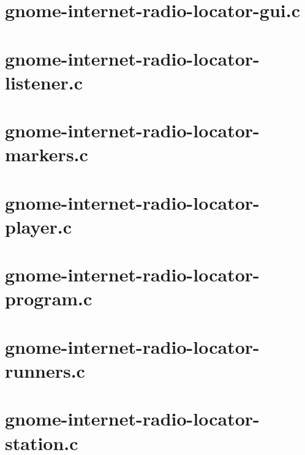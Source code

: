 \documentclass[a4paper,norsk,utf8]{report}
\begin{document}
\section{gnome-internet-radio-locator-gui.c}



\section{gnome-internet-radio-locator-listener.c}



\section{gnome-internet-radio-locator-markers.c}



\section{gnome-internet-radio-locator-player.c}



\section{gnome-internet-radio-locator-program.c}



\section{gnome-internet-radio-locator-runners.c}



\section{gnome-internet-radio-locator-station.c}


\end{document}
